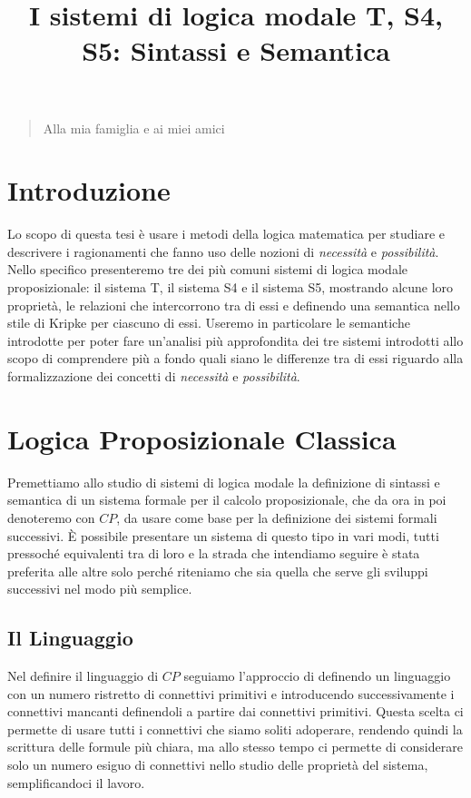 \documentclass[a4paper, titlepage, 12pt]{report}
\title{I sistemi di logica modale T, S4, S5: Sintassi e Semantica}
\date{}
\newenvironment{dedication}
         {\vspace{6ex}\begin{quotation}\begin{center}\begin{em}}
         {\par\end{em}\end{center}\end{quotation}}
\begin{document}
\begin{dedication}
Alla mia famiglia e ai miei amici
\end{dedication}
\tableofcontents
\chapter*{Introduzione}
Lo scopo di questa tesi è usare i metodi della logica matematica
per studiare e descrivere i ragionamenti che fanno uso delle nozioni
di \emph{necessità} e \emph{possibilità}. Nello specifico
presenteremo tre dei più comuni sistemi di logica modale proposizionale:
il sistema T, il sistema S4 e il sistema S5, mostrando alcune loro proprietà,
le relazioni che intercorrono tra di essi e definendo una semantica nello
stile di Kripke per ciascuno di essi. Useremo in particolare le semantiche introdotte
per poter fare un'analisi più approfondita dei tre sistemi introdotti
allo scopo di comprendere più a fondo quali siano le differenze tra di essi
riguardo alla formalizzazione dei concetti di \emph{necessità} e \emph{possibilità}.


\chapter{Logica Proposizionale Classica}
Premettiamo allo studio di sistemi di logica modale la definizione
di sintassi e semantica di un sistema formale per il calcolo proposizionale,
che da ora in poi denoteremo con $CP$, da usare come base per la definizione
dei sistemi formali successivi.
È possibile presentare un sistema di questo tipo in vari modi, tutti pressoché equivalenti tra di loro
e la strada che intendiamo seguire è stata preferita alle altre solo
perché riteniamo che sia quella che serve gli sviluppi successivi nel modo più semplice.

\section{Il Linguaggio}
Nel definire il linguaggio di $CP$ seguiamo l'approccio di \cite{IntroModale}
definendo un linguaggio con un numero ristretto
di connettivi primitivi e introducendo successivamente i connettivi mancanti definendoli a partire
dai connettivi primitivi.
Questa scelta ci permette di usare tutti i connettivi che siamo soliti adoperare,
rendendo quindi la scrittura delle formule più chiara, ma allo stesso tempo ci permette di
considerare solo un numero esiguo di connettivi nello studio delle proprietà del sistema,
semplificandoci il lavoro.
\end{document}
